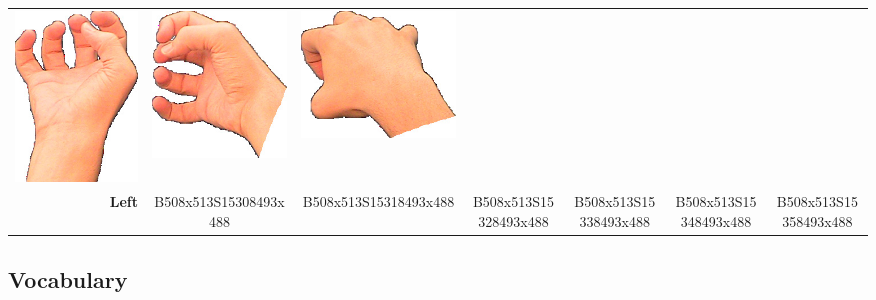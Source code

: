 \documentclass{article}
\begin{document}
\begin{center}
\begin{tabular}{r*{6}{c}}
\includegraphics[scale=0.1]{images/05-07-4.jpg}&
\includegraphics[scale=0.1]{images/05-07-5.jpg}&
\includegraphics[scale=0.1]{images/05-07-6.jpg}\\
\textbf{Left}&
B508x513S15308493x488&
B508x513S15318493x488&
B508x513S15328493x488&
B508x513S15338493x488&
B508x513S15348493x488&
B508x513S15358493x488\\
\end{tabular}
\end{center}

\subsection{Vocabulary}
\end{document}
